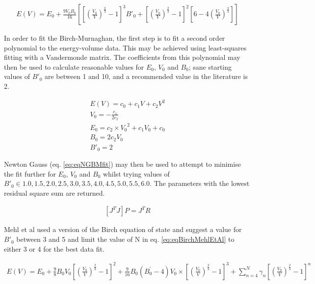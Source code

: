 \begin{equation}
\begin{split}
E(V) = E_0 + \frac{9 V_0 B_0}{16} \left[ \left[ \left(\frac{V_0}{V} \right)^{\frac{2}{3}}-1\right]^{3} {B'}_0 + \left[ \left(\frac{V_0}{V} \right)^{\frac{2}{3}}-1\right]^{2} \left[6 - 4 \left(\frac{V_0}{V} \right)^{\frac{2}{3}}\right] \right]
\end{split}
\label{eq:eqMurnachanEquationofStateVolume}
\end{equation}

In order to fit the Birch-Murnaghan, the first step is to fit a second order polynomial to the energy-volume data.  This may be achieved using least-squares fitting with a Vandermonde matrix.  The coefficients from this polynomial may then be used to calculate reasonable values for $E_0$, $V_0$ and $B_0$; sane starting values of ${B'}_0$ are between 1 and 10, and a recommended value in the literature is 2\cite{gilgamesheos}.

\begin{equation}
\begin{split}
E(V) = c_0 + c_1 V + c_2 V^2 \\
V_0 = -\frac{c_1}{2c_2} \\
E_0 = c_2 \times {V_0}^2 + c_1 V_0 + c_0  \\
B_0 = 2 c_2 V_0 \\
{B'}_0 = 2
\end{split}
\label{eq:eqMurnachanEquationofStateVolume}
\end{equation}

Newton Gauss (eq. \ref{eq:eqNGBMfit}) may then be used to attempt to minimise the fit further for $E_0$, $V_0$ and $B_0$ whilst trying values of ${B'}_0 \in {1.0,1.5,2.0,2.5,3.0,3.5,4.0,4.5,5.0,5.5,6.0}$.  The parameters with the lowest residual square sum are returned.

\begin{equation}
\begin{split}
\left[J^T J\right] P = J^T R
\end{split}
\label{eq:eqNGBMfit}
\end{equation}

Mehl et al used a version of the Birch equation of state\cite{birchmurnaghaneq} and suggest a value for ${B'}_0$ between 3 and 5\cite{mehlsp} and limit the value of N in eq. \ref{eq:eqBirchMehlEtAl} to either 3 or 4 for the best data fit.

\begin{equation}
\begin{split}
E(V) = E_0 + \frac{9}{8} B_0 V_0 \left[ \left(\frac{V_0}{V}\right)^{\frac{2}{3}} - 1 \right]^{2} + \frac{9}{16} B_0(B_0^{'} - 4) V_0 \times \left[ \left(\frac{V_0}{V}\right)^{\frac{2}{3}} - 1 \right]^{3} + \sum_{n=4}^{N} \gamma_n \left[ \left(\frac{V_0}{V}\right)^{\frac{2}{3}} - 1 \right]^{n}
\end{split}
\label{eq:eqBirchMehlEtAl}
\end{equation}

